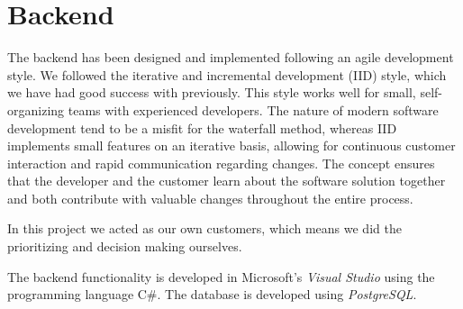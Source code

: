 \chapter{Backend}
\label{chap:backend}

The backend has been designed and implemented following an agile development style. We followed the iterative and incremental development (IID) style, which we have had good success with previously. This style works well for small, self-organizing teams with experienced developers. The nature of modern software development tend to be a misfit for the waterfall method, whereas IID implements small features on an iterative basis, allowing for continuous customer interaction and rapid communication regarding changes. The concept ensures that the developer and the customer learn about the software solution together and both contribute with valuable changes throughout the entire process. 

In this project we acted as our own customers, which means we did the prioritizing and decision making ourselves.

The backend functionality is developed in Microsoft's \textit{Visual Studio}\cite{visualstudio} using the programming language C\#. The database is developed using \textit{PostgreSQL}\cite{postgreSQL}.





